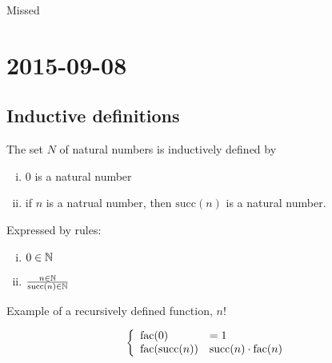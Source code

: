 \documentclass[12pt]{report}
\begin{document}
Missed


\chapter{2015-09-08}

\section{Inductive definitions}

The set $N$ of natural numbers is inductively defined by
\begin{enumerate}[(i)]
\item 0 is a natural number
\item if $n$ is a natrual number, then $\text{succ}(n)$ is a natural number.
\end{enumerate}

Expressed by rules:
\begin{enumerate}[(i)]
\item $0 \in \mathbb{N}$
\item $\frac{n \in \mathbb{N}}{\text{succ}(n) \in \mathbb{N}}$
\end{enumerate}

Example of a recursively defined function, $n!$

\[\left\{ \begin{array}{l l} \text{fac}(0) & = 1 \\ \text{fac(succ($n$))} & \text{succ}(n) \cdot
  \text{fac}(n) \end{array} \right. \]
\end{document}
